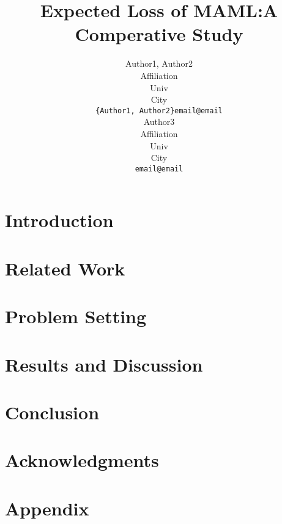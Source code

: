 \documentclass{article}
\title{Expected Loss of MAML:A Comperative Study}
\author{
  Author1, Author2 \\
  Affiliation \\
  Univ \\
  City\\
  \texttt{\{Author1, Author2\}email@email} \\
   \And
  Author3 \\
  Affiliation \\
  Univ \\
  City\\
  \texttt{email@email} \\
}
\newcommand{\version}{v1/}
\begin{document}
\maketitle


\begin{abstract}
  
\end{abstract}



\section{Introduction}\label{sec:intro}
  
\section{Related Work}\label{sec:rw}
  
\section{Problem Setting}\label{sec:methods}
  
\section{Results and Discussion}\label{sec:resdis}
  
\section{Conclusion}\label{sec:conc}
  
\section*{Acknowledgments}
  
  
\section{Appendix}
  
\end{document}
